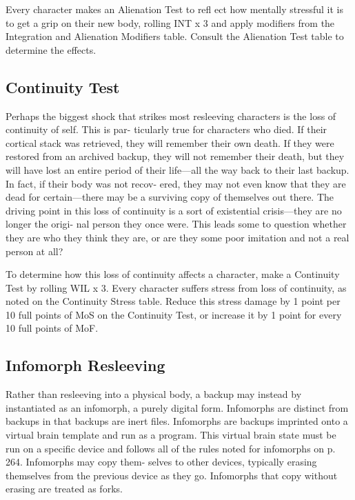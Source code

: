 Every character makes an Alienation Test to refl ect 
how mentally stressful it is to get a grip on their new 
body, rolling INT x 3 and apply modifiers from the 
Integration and Alienation Modifiers table. Consult 
the Alienation Test table to determine the effects.

\subsection{Continuity Test}

Perhaps the biggest shock that strikes most resleeving 
characters is the loss of continuity of self. This is par-
ticularly true for characters who died. If their cortical 
stack was retrieved, they will remember their own 
death. If they were restored from an archived backup, 
they will not remember their death, but they will have 
lost an entire period of their life—all the way back to 
their last backup. In fact, if their body was not recov-
ered, they may not even know that they are dead for 
certain—there may be a surviving copy of themselves 
out there. The driving point in this loss of continuity is 
a sort of existential crisis—they are no longer the origi-
nal person they once were. This leads some to question 
whether they are who they think they are, or are they 
some poor imitation and not a real person at all?

To determine how this loss of continuity affects a 
character, make a Continuity Test by rolling WIL x 3. 
Every character suffers stress from loss of continuity, 
as noted on the Continuity Stress table. Reduce this 
stress damage by 1 point per 10 full points of MoS on 
the Continuity Test, or increase it by 1 point for every 
10 full points of MoF.

\subsection{Infomorph Resleeving}

Rather than resleeving into a physical body, a backup 
may instead by instantiated as an infomorph, a purely 
digital form. Infomorphs are distinct from backups in 
that backups are inert files. Infomorphs are backups 
imprinted onto a virtual brain template and run as 
a program. This virtual brain state must be run on a 
specific device and follows all of the rules noted for 
infomorphs on p. 264. Infomorphs may copy them-
selves to other devices, typically erasing themselves 
from the previous device as they go. Infomorphs that 
copy without erasing are treated as forks.


